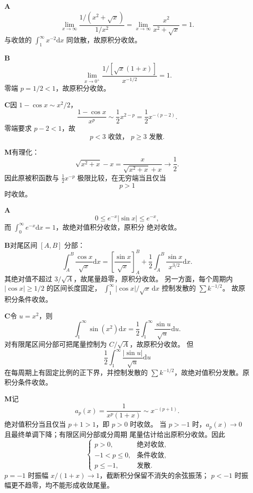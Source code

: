 \begin{solutionBox}
\textbf{A}\quad
\[
\lim_{x\to\infty}
\frac{1/(x^2+\sqrt x)}{1/x^2}
=\lim_{x\to\infty}\frac{x^2}{x^2+\sqrt x}=1.
\]
与收敛的 \(\int_1^\infty x^{-2}\mathrm dx\) 同敛散，故原积分收敛。
\end{solutionBox}
\begin{solutionBox}
\textbf{B}\quad
\[
\lim_{x\to0^+}
\frac{1/[\sqrt x(1+x)]}{x^{-1/2}}=1.
\]
零端 \(p=1/2<1\)，故原积分收敛。
\end{solutionBox}
\begin{solutionBox}
\textbf{C}\quad 因 \(1-\cos x\sim x^2/2\)，
\[
\frac{1-\cos x}{x^p}\sim\frac12x^{2-p}
=\frac12x^{-(p-2)}.
\]
零端要求 \(p-2<1\)，故
\[
\boxed{p<3\text{ 收敛， }p\ge3\text{ 发散}.}
\]
\end{solutionBox}
\begin{solutionBox}
\textbf{M}\quad 有理化：
\[
\sqrt{x^2+x}-x
=\frac{x}{\sqrt{x^2+x}+x}\longrightarrow\frac12.
\]
因此原被积函数与 \(\frac12x^{-p}\) 极限比较，在无穷端当且仅当
\[
\boxed{p>1}
\]
时收敛。
\end{solutionBox}

\begin{solutionBox}
\textbf{A}\quad
\[
0\le e^{-x}|\sin x|\le e^{-x},
\]
而 \(\int_0^\infty e^{-x}\mathrm dx=1\)，故绝对值积分收敛，原积分
绝对收敛。
\end{solutionBox}
\begin{solutionBox}
\textbf{B}\quad 对尾区间 \([A,B]\) 分部：
\[
\int_A^B\frac{\cos x}{\sqrt x}\mathrm dx
=\left[\frac{\sin x}{\sqrt x}\right]_A^B
+\frac12\int_A^B\frac{\sin x}{x^{3/2}}\mathrm dx.
\]
其绝对值不超过 \(3/\sqrt A\)，故尾量趋零，原积分收敛。
另一方面，每个周期内 \(|\cos x|\ge1/2\) 的区间长度固定，
\(\int_1^\infty|\cos x|/\sqrt x\,\mathrm dx\) 控制发散的
\(\sum k^{-1/2}\)。
故原积分条件收敛。
\end{solutionBox}
\begin{solutionBox}
\textbf{C}\quad 令 \(u=x^2\)，则
\[
\int_1^\infty\sin(x^2)\mathrm dx
=\frac12\int_1^\infty\frac{\sin u}{\sqrt u}\mathrm du.
\]
对有限尾区间分部可把尾量控制为 \(C/\sqrt A\)，故原积分收敛。
但
\[
\frac12\int_1^\infty\frac{|\sin u|}{\sqrt u}\mathrm du
\]
在每周期上有固定比例的正下界，并控制发散的
\(\sum k^{-1/2}\)，故绝对值积分发散。原积分条件收敛。
\end{solutionBox}
\begin{solutionBox}
\textbf{M}\quad 记
\[
a_p(x)=\frac1{x^p(1+x)}\sim x^{-(p+1)}.
\]
绝对值积分当且仅当 \(p+1>1\)，即 \(p>0\) 时收敛。
当 \(p>-1\) 时，\(a_p(x)\to0\) 且最终单调下降；有限区间分部或分周期
尾量估计给出原积分收敛。因此
\[
\boxed{
\begin{cases}
p>0,&\text{绝对收敛},\\
-1<p\le0,&\text{条件收敛},\\
p\le-1,&\text{发散}.
\end{cases}}
\]
\(p=-1\) 时振幅 \(x/(1+x)\to1\)，截断积分保留不消失的余弦振荡；
\(p<-1\) 时振幅更不趋零，均不能形成收敛尾量。
\end{solutionBox}

